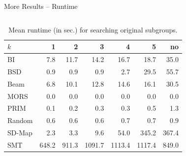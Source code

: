 \documentclass[en, navbaroff]{sdqbeamer}
\begin{document}
\begin{frame}[t]{More Results -- Runtime}
	\begin{columns}[T]
		\begin{column}{\kitthreecolumns}
			\begin{table}
				\centering
				\caption*{
					Mean runtime (in sec.) for searching original subgroups.
				}
				\begin{tabular}{lrrrrrr}
					\toprule
					$k$ & 1 & 2 & 3 & 4 & 5 & no \\
					\midrule
					BI & 7.8 & 11.7 & 14.2 & 16.7 & 18.7 & 35.0 \\
					BSD & 0.9 & 0.9 & 0.9 & 2.7 & 29.5 & 55.7 \\
					Beam & 6.8 & 10.1 & 12.8 & 14.6 & 16.1 & 30.5 \\
					MORS & 0.0 & 0.0 & 0.0 & 0.0 & 0.0 & 0.0 \\
					PRIM & 0.1 & 0.2 & 0.3 & 0.3 & 0.5 & 1.3 \\
					Random & 0.6 & 0.6 & 0.6 & 0.7 & 0.7 & 0.9 \\
					SD-Map & 2.3 & 3.3 & 9.6 & 54.0 & 345.2 & 367.4 \\
					SMT & 648.2 & 911.3 & 1091.7 & 1113.4 & 1117.4 & 849.0 \\
					\bottomrule
				\end{tabular}
				\label{tab:csd:cardinality-runtime}
			\end{table}
		\end{column}
		\begin{column}{\kitthreecolumns}
			\begin{table}[t]
				\centering
				\caption*{
					Mean runtime (in sec.) for searching alternative subgroup descriptions.
}
\end{table}
\end{column}
\end{columns}
\end{frame}
\end{document}
